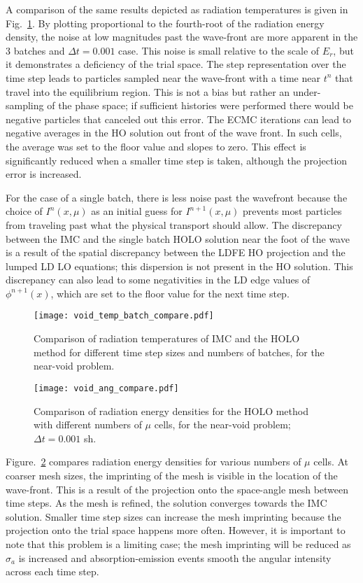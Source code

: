 A comparison of the same results depicted as radiation temperatures is given in Fig.~\ref{fig:void_temp_compare}.  By plotting
proportional to the fourth-root of the radiation energy density, the noise at low
magnitudes past the wave-front are more apparent in the 3 batches and $\Delta t = 0.001$
case.  This noise is small relative to the scale of $E_r$, but it demonstrates a
deficiency of the trial space.  The step representation over
the time step leads to particles sampled near the wave-front with a time near
$t^{n}$ that travel into the equilibrium region.  This is not a
bias but rather an under-sampling of the phase space; if sufficient histories were performed there
would be negative particles that canceled out this error. The ECMC iterations can lead to negative
averages in the HO solution out front of the wave front.  In such cells, the
average was set to the floor value and slopes to zero. This effect is
significantly reduced when a smaller time step is taken, although the projection error is
increased.

For the case of a single batch, 
there is less noise past the wavefront because the
choice of $I^{n}(x,\mu)$ as an initial guess for $I^{n+1}(x,\mu)$ prevents most particles from
traveling past what the physical transport should allow.  The discrepancy between the IMC
and the single batch HOLO solution near the foot of
the wave is a result of the spatial discrepancy between the LDFE HO projection and the
lumped LD LO equations; this dispersion is not present in the HO solution.  This
discrepancy can also lead to some negativities in the LD edge values of
$\phi^{n+1}(x)$, which are set to the floor value for the next time step. 
\begin{figure}[H]
  \centering
    \texttt{[image: void\_temp\_batch\_compare.pdf]}
    \caption{\label{fig:void_temp_compare} Comparison of radiation temperatures of IMC and
    the HOLO method for different time step sizes and numbers of batches, for the
near-void problem.}
\end{figure}

\begin{figure}[H]
  \centering
    \texttt{[image: void\_ang\_compare.pdf]}
    \caption{\label{fig:bumps} Comparison of radiation energy densities for
    the HOLO method with different numbers of $\mu$ cells, for the near-void problem; $\Delta t=0.001$ sh.
}
\end{figure}

Figure.~\ref{fig:bumps} compares radiation energy densities for various numbers of $\mu$
cells.  At coarser mesh sizes, the imprinting of the mesh is visible in the location of
the wave-front.  This is a result of the projection onto the space-angle mesh between time
steps.  As the mesh is refined, the solution converges towards the IMC solution.  
Smaller time step sizes can increase the mesh imprinting because the projection onto the
trial space happens more often.  However, it is important to note that this problem is a
limiting case; the mesh imprinting will be reduced as $\sigma_a$ is increased and
absorption-emission events smooth the angular intensity across each time step.

